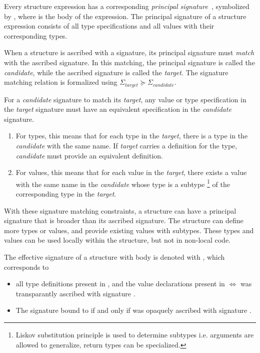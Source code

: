 Every structure expression has a corresponding \emph{principal signature}~\cite{Pierce:Adv}, symbolized by , where  is the body of the  expression.
The principal signature of a structure expression consists of all type specifications and all values with their corresponding types.

When a structure is ascribed with a signature, its principal signature must \emph{match} with the ascribed signature.
In this matching, the principal signature is called the \emph{candidate}, while the ascribed signature is called the \emph{target}.
The signature matching relation is formalized using $\mathit{\Sigma_{target}}\succeq\mathit{\Sigma_{candidate}}$.

For a \emph{candidate} signature to match its \emph{target}, any value or type specification in the \emph{target} signature must have an equivalent specification in the \emph{candidate} signature.
\begin{enumerate}
\item For types, this means that for each type in the \emph{target}, there is a type in the \emph{candidate} with the same name.
If \emph{target} carries a definition for the type, \emph{candidate} must provide an equivalent definition.
\item For values, this means that for each value in the \emph{target}, there exists a value with the same name in the \emph{candidate} whose type 
is a subtype
\footnote{Liskov substitution principle is used to determine subtypes i.e. arguments are allowed to generalize, return types can be specialized.}
of the corresponding type in the \emph{target}.
\end{enumerate}

With these signature matching constraints, a structure can have a principal signature that is broader than its ascribed signature.
The structure can define more types or values, and provide existing values with subtypes.
These types and values can be used locally within the structure, but not in non-local code.

The effective signature of a structure  with body  is denoted with , which corresponds to
\begin{itemize}
\item all type definitions present in , and the value declarations present in  $\Leftrightarrow$  was transparantly ascribed with signature .
\item The signature bound to  if and only if  was opaquely ascribed with signature .
\end{itemize}

